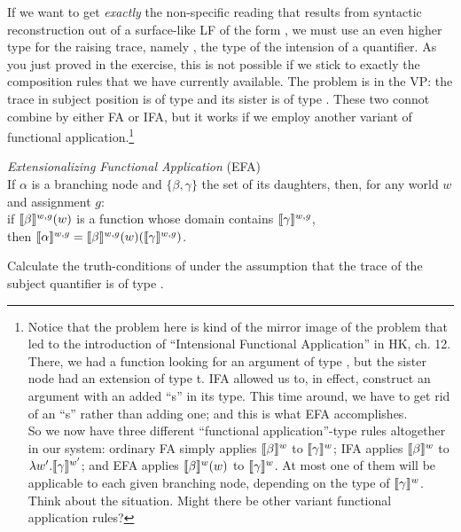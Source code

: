 If we want to get \emph{exactly} the non-specific reading that results from syntactic reconstruction out of a surface-like LF of the form , we must use an even higher type for the raising trace, namely , the type of the intension of a quantifier. As you just proved in the exercise, this is not possible if we stick to exactly the composition rules that we have currently available. The problem is in the VP: the trace in subject position is of type  and its sister is of type . These two connot combine by either FA or IFA, but it works if we employ another variant of functional application.\footnote{Notice that the problem here is kind of the mirror image of the problem that led to the introduction of ``Intensional Functional Application'' in H\amp K, ch. 12. There, we had a function looking for an argument of type , but the sister node had an extension of type t. IFA allowed us to, in effect, construct an argument with an added ``s'' in its type. This time around, we have to get rid of an ``s'' rather than adding one; and this is what EFA accomplishes. \\
  \indent So we now have three different ``functional application''-type rules altogether in our system: ordinary FA simply applies $\llbracket \beta \rrbracket^w$ to $\llbracket \gamma \rrbracket^w$; IFA applies $\llbracket \beta \rrbracket^w$ to $\lambda w'.\llbracket \gamma \rrbracket^{w'}$; and EFA applies $\llbracket \beta \rrbracket^w(w)$ to $\llbracket \gamma \rrbracket^w$. At most one of them will be applicable to each given branching node, depending on the type of $\llbracket \gamma \rrbracket^w$.\\
  \indent Think about the situation. Might there be other variant functional
  application rules?}

\ex \emph{Extensionalizing Functional Application} (EFA)\\
If $\alpha$ is a branching node and $\{\beta,\gamma\}$ the set of its daughters, then, for any world $w$ and assignment $g$: \\
if $\llbracket \beta \rrbracket^{w,g}(w)$ is a function whose domain contains $\llbracket \gamma \rrbracket^{w,g}$,\\
then $\llbracket \alpha \rrbracket^{w,g} = \llbracket \beta \rrbracket^{w,g}(w)(\llbracket \gamma \rrbracket^{w,g})$.
\xe

\begin{exercise}
	
	Calculate the truth-conditions of  under the assumption that the
  trace of the subject quantifier is of type .
  \eex
\end{exercise}

